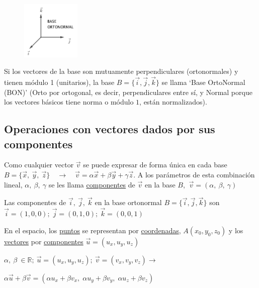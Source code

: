 \vspace{3mm}

\begin{multicols}{2}
	\begin{figure}[H]
	\centering
	\includegraphics[width=0.25\textwidth]{imagenes/imagenescv/T10IM05.png}
	\end{figure}
	Si los vectores de la base son mutuamente perpendiculares (ortonormales) y tienen módulo 1 (unitarios), la base $B=\{\vec i, \vec j, \vec k \}$ se llama `Base OrtoNormal (BON)' 
	\footnotesize{(Orto por ortogonal, es decir, perpendiculares entre sí, y Normal porque los vectores básicos tiene norma o módulo $1$, están normalizados)}\normalsize{.}
\end{multicols}

\subsection{Operaciones con vectores dados por sus componentes}

Como cualquier vector $\vec v$  se puede expresar de forma única en cada base $B=\{\vec x,\ \vec y, \ \vec z\} \quad \to \quad \vec v= \alpha \vec x+ \beta \vec y+ \gamma \vec z$. A los parámetros de esta combinación lineal, $\alpha, \ \beta, \ \gamma$ se les llama \underline{componentes} de $\vec v$ en la base $B$, $\ \vec v=(\alpha, \ \beta, \ \gamma)$
		
Las componentes de $\vec i, \ \vec j, \ \vec k$ en la base ortonormal $B=\{ \vec i, \vec j, \vec k \} $ son $\vec i=(1,0,0); \ \vec j=(0,1,0); \ \vec k=(0,0,1)$
		
 En el espacio, los \underline{puntos} se representan por \underline{coordenadas}, $A(x_0, y_0, z_0)$ y los \underline{vectores} por \underline{componentes} $\vec u=(u_x, u_y, u_z)$


		
\vspace{3mm} $ \alpha , \ \beta \ \in \mathbb{R}; \ \vec u=(u_x,u_y,u_z); \ \vec v = (v_x ,v_y ,v_z) \to $
		
\vspace{2mm}\hspace{20mm}$\alpha \vec u+\beta \vec v=
			(\alpha  u_x+\beta  v_x,\;  \alpha  u_y+\beta  v_y,\;  \alpha  u_z+\beta  v_z) $
			
